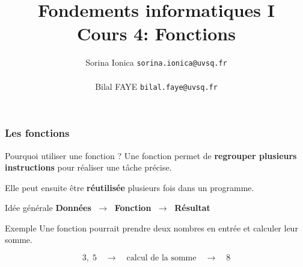 \documentclass[10pt]{beamer}
\title[IN100 Cours 4]{\textbf{Fondements informatiques I}\\
Cours 4: Fonctions}
\author[]{Sorina Ionica \texttt{sorina.ionica@uvsq.fr} \\~\\Bilal FAYE  \texttt{bilal.faye@uvsq.fr} }
\institute{}
\date{}
\begin{document}
\frame{\titlepage}


\begin{frame}
	\frametitle{Les fonctions}
	
	\begin{block}{Pourquoi utiliser une fonction ?}
		Une fonction permet de \textbf{regrouper plusieurs instructions}
		pour réaliser une tâche précise.
		
		\vspace{0.1cm}
		
		Elle peut ensuite être \textbf{réutilisée} plusieurs fois dans un programme.
	\end{block}
	
	\vspace{0.2cm}
	
	\begin{exampleblock}{Idée générale}
		\centering
		\textbf{Données}
		$\;\longrightarrow\;$
		\textbf{Fonction}
		$\;\longrightarrow\;$
		\textbf{Résultat}
	\end{exampleblock}
	
	\vspace{0.2cm}
	
	\begin{alertblock}{Exemple}
		Une fonction pourrait prendre deux nombres en entrée
		et calculer leur somme.
		
		\[
		3,\;5
		\quad\longrightarrow\quad
		\text{calcul de la somme}
		\quad\longrightarrow\quad
		8
		\]
	\end{alertblock}
	
\end{frame}
\end{document}
